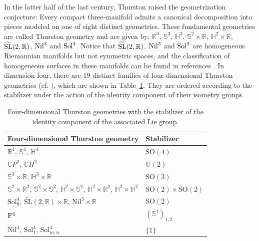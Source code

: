 \documentclass[reqno]{amsart}%
\theoremstyle{definition}
\numberwithin{equation}{section}
\begin{document}
	In the latter half of the last century, Thurston \cite{T} raised the geometrization conjecture: Every compact three-manifold admits a canonical decomposition into pieces modeled on one of
	eight distinct geometries. These fundamental geometries are called Thurston geometry and are given by:
	$\mathbb{R}^3$, $\mathbb{S}^3$, $\mathbb{H}^3$, $\mathbb{S}^2\times\mathbb{R}$, $\mathbb{H}^2\times\mathbb{R}$, $\widetilde{{\rm SL}}(2,\mathbb{R})$,
	${\rm Nil}^3$ and ${\rm Sol}^3$.
	Notice that $\widetilde{{\rm SL}}(2,\mathbb{R})$,
	${\rm Nil}^3$ and ${\rm Sol}^3$ are homogeneous Riemannian manifolds but not symmetric spaces, and
	the classification of homogeneous surfaces in these manifolds can be found in references \cite{DFO,DM,MP}.
	In dimension four, there are $19$ distinct families of four-dimensional Thurston geometries (cf. \cite{F,W}), which are shown in Table~\ref{tab:thurston-geometries}.
	They are ordered according to the stabilizer under the action of the identity component of their isometry groups.
	
	\begingroup
	\setlength{\tabcolsep}{10pt} %
	\renewcommand{\arraystretch}{1.8} %
	\begin{table}[h]
		\centering
		\renewcommand{\arraystretch}{1.3} %
		\begin{tabular}{l l}
			\toprule
			Four-dimensional Thurston geometry    & Stabilizer \\
			\midrule
			$\mathbb{R}^4, \, \mathbb{S}^4, \, \mathbb{H}^4$ & $\text{SO}(4)$ \\ \hline
			$\mathbb{C}P^2, \, \mathbb{C}H^2$ & $\text{U}(2)$ \\ \hline
			$\mathbb{S}^3 \times \mathbb{R}, \, \mathbb{H}^3 \times \mathbb{R}$ & $\text{SO}(3)$ \\ \hline
			$\mathbb{S}^2 \times \mathbb{R}^2, \, \mathbb{S}^2 \times \mathbb{S}^2, \, \mathbb{H}^2 \times \mathbb{S}^2, \, \mathbb{H}^2 \times \mathbb{R}^2, \, \mathbb{H}^2 \times \mathbb{H}^2$ & $\text{SO}(2) \times \text{SO}(2)$ \\ \hline
			$\text{Sol}_0^4, \, \widetilde{\text{SL}}(2, \mathbb{R}) \times \mathbb{R}, \, \text{Nil}^3 \times \mathbb{R}$ & $\text{SO}(2)$ \\ \hline
			${\rm F^4}$ & $(\mathbb{S}^1)_{1,2}$ \\ \hline
			$\text{Nil}^4, \, \text{Sol}_1^4, \, \text{Sol}_{m,n}^4$ & $\{1\}$ \\ 
			\bottomrule
		\end{tabular}
		\caption{Four-dimensional Thurston geometries with the stabilizer of the identity component of the associated Lie group.}
		\label{tab:thurston-geometries} 
	\end{table}
	\endgroup
	
\end{document}
